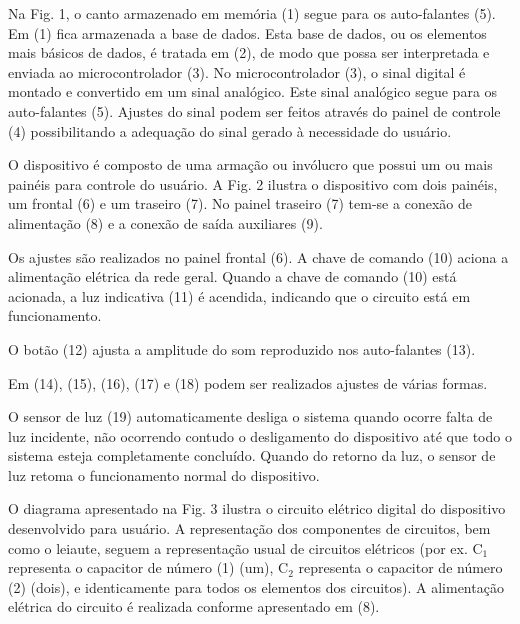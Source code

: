 \documentclass[12pt]{article}
\begin{document}
Na Fig. 1, o canto armazenado em memória (1) segue para os
auto-falantes (5).  Em (1) fica armazenada a base de dados.  Esta base
de dados, ou os elementos mais básicos de dados, é tratada em (2), de
modo que possa ser interpretada e enviada ao microcontrolador (3).  No
microcontrolador (3), o sinal digital é montado e convertido em um
sinal analógico. Este sinal analógico segue para os auto-falantes (5).
Ajustes do sinal podem ser feitos através do painel de controle (4)
possibilitando a adequação do sinal gerado à necessidade do usuário.




O dispositivo é composto de uma armação ou invólucro que possui um ou
mais painéis para controle do usuário.  A Fig. 2 ilustra o dispositivo
com dois painéis, um frontal (6) e um traseiro (7).  No painel
traseiro (7) tem-se a conexão de alimentação (8) e a conexão de saída
auxiliares (9).

Os ajustes são realizados no painel frontal (6).  A chave de comando
(10) aciona a alimentação elétrica da rede geral.  Quando a chave de
comando (10) está acionada, a luz indicativa (11) é acendida,
indicando que o circuito está em funcionamento.

O botão (12) ajusta a amplitude do som reproduzido nos auto-falantes
(13).

Em (14), (15), (16), (17) e (18) podem ser realizados ajustes de
várias formas.
 
O sensor de luz (19) automaticamente desliga o sistema quando ocorre
falta de luz incidente, não ocorrendo contudo o desligamento do
dispositivo até que todo o sistema esteja completamente concluído.
Quando do retorno da luz, o sensor de luz retoma o funcionamento
normal do dispositivo.





O diagrama apresentado na Fig. 3 ilustra o circuito elétrico digital
do dispositivo desenvolvido para usuário. A representação dos
componentes de circuitos, bem como o leiaute, seguem a representação
usual de circuitos elétricos (por ex.  C$_{\mathrm{1}}$ representa o
capacitor de número (1) (um), C$_{\mathrm{2}}$ representa o capacitor
de número (2) (dois), e identicamente para todos os elementos dos
circuitos). A alimentação elétrica do circuito é realizada conforme
apresentado em (8).
\end{document}

